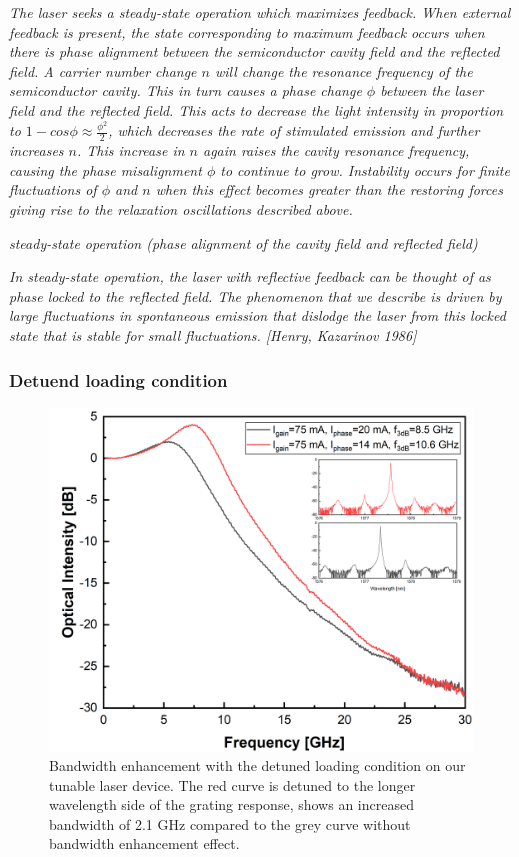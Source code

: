 \textit{The laser seeks a steady-state operation which maximizes feedback. When external feedback is present, the state corresponding to maximum feedback occurs when there is phase alignment  between the semiconductor cavity field and the reflected field. A carrier number change $n$ will change the resonance frequency of the semiconductor cavity. This in turn causes a phase change $\phi$ between the laser field and the reflected field. This acts to decrease the light intensity in proportion to $1-cos{\phi}\approx\frac{\phi^2}{2}$, which decreases the rate of stimulated emission and further increases $n$. This increase in $n$ again raises the cavity resonance frequency, causing the phase misalignment $\phi$ to continue to grow. Instability occurs for finite fluctuations of $\phi$ and $n$ when this effect becomes greater than the restoring forces giving rise to the relaxation oscillations described above.}

\textit{steady-state operation (phase alignment of the cavity field and reflected field)}

\textit{In steady-state operation, the laser with reflective feedback can be thought of as phase locked to the reflected field. The phenomenon that we describe is driven by large fluctuations in spontaneous emission that dislodge the laser from this locked state that is stable for small fluctuations. [Henry, Kazarinov 1986]}

\subsubsection{Detuend loading condition}
\begin{figure}[!htb]
    \centering
    \includegraphics[width=.6\linewidth]{figures/detuned_loading.png}
    \caption{Bandwidth enhancement with the detuned loading condition on our tunable laser device. The red curve is detuned to the longer wavelength side of the grating response, shows an increased bandwidth of 2.1 GHz compared to the grey curve without bandwidth enhancement effect.}
    \label{fig:detuned_loading}
\end{figure}

